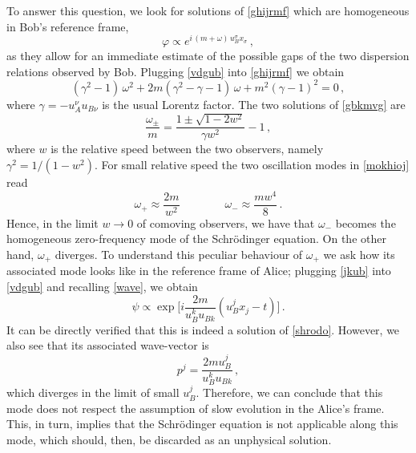 \documentclass[a4paper, amsfonts, amssymb, amsmath, reprint, twocolumn, showkeys, nofootinbib]{revtex4-2}
\begin{document}
To answer this question, we look for solutions of \eqref{ghijrmf} which are homogeneous in Bob's reference frame,
\begin{equation}\label{vdgub}
\varphi \propto e^{i \, (m+\omega) \, u_B^\sigma x_\sigma} \, ,
\end{equation}
as they  allow for an immediate estimate of the possible gaps of the two dispersion relations observed by Bob. Plugging \eqref{vdgub} into \eqref{ghijrmf} we obtain
\begin{equation}\label{gbkmvg}
(\gamma^2-1) \, \omega^2 + 2m (\gamma^2-\gamma-1) \, \omega + m^2(\gamma-1)^2 =0 \, ,
\end{equation}
where $\gamma=-u_A^\nu u_{B\nu}$ is the usual Lorentz factor. The two solutions of  \eqref{gbkmvg} are
\begin{equation}\label{mokhioj}
\dfrac{\omega_{\pm}}{m} = \dfrac{1 \pm \sqrt{1-2w^2}}{\gamma w^2} -1 \, ,
\end{equation}
where $w$ is the relative speed between the two observers, namely $\gamma^{2} =1/( 1-w^2)$.
For small relative speed the two oscillation modes in \eqref{mokhioj} read 
\begin{equation}\label{jkub}
\omega_+ \approx \dfrac{2m}{w^2}   \quad \quad \quad \quad    \omega_- \approx \dfrac{m w^4}{8} \, .
\end{equation}  
Hence, in the limit $w \rightarrow 0$ of comoving observers, we have that $\omega_-$ becomes the homogeneous zero-frequency mode of the Schr\"{o}dinger equation. On the other hand, $\omega_+$ diverges. To understand this peculiar behaviour of $\omega_+$ we ask how its associated mode looks like in the reference frame of Alice; plugging \eqref{jkub} into \eqref{vdgub} and recalling \eqref{wave}, we obtain
\begin{equation}\label{ilproblematicoAAA}
\psi \propto \exp \bigg[i \dfrac{2m}{u_B^k u_{Bk}} (u_B^j x_j-t)  \bigg] \, .
\end{equation}
It can be directly verified that this is indeed a solution of \eqref{shrodo}. However, we also see that its associated wave-vector is
\begin{equation}
p^j = \dfrac{2mu_B^j}{u_B^k u_{Bk}} \, ,
\end{equation}
which diverges in the limit of small $u_B^j$. Therefore, we can conclude that this mode does not respect the assumption of slow evolution in the Alice's frame. This, in turn, implies that the Schr\"{o}dinger equation is not applicable along this mode, which should, then, be discarded as an unphysical solution.
\end{document}
